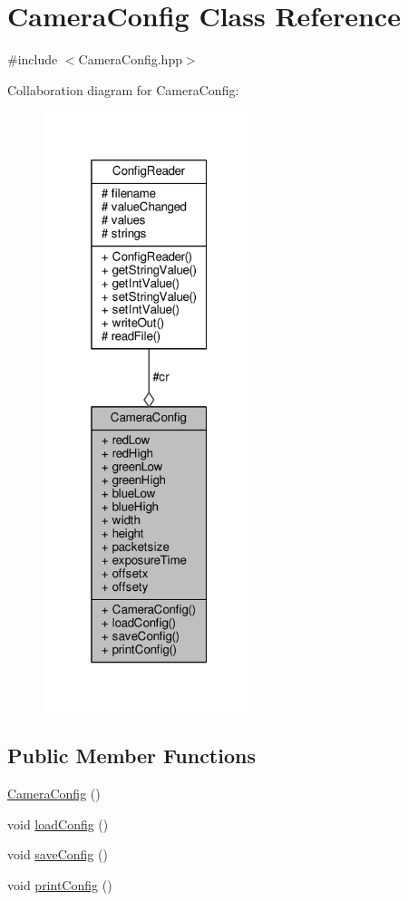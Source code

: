 \hypertarget{class_camera_config}{}\section{Camera\+Config Class Reference}
\label{class_camera_config}


{\ttfamily \#include $<$Camera\+Config.\+hpp$>$}



Collaboration diagram for Camera\+Config\+:\nopagebreak
\begin{figure}[H]
\begin{center}
\leavevmode
\includegraphics[width=175pt]{class_camera_config__coll__graph}
\end{center}
\end{figure}
\subsection*{Public Member Functions}
\begin{DoxyCompactItemize}
\item 
\hyperlink{class_camera_config_a03e6228afa19acfc757e310781372b6e}{Camera\+Config} ()
\item 
void \hyperlink{class_camera_config_ab8a2db9f299dc56cebcfc20b0ce72c8f}{load\+Config} ()
\item 
void \hyperlink{class_camera_config_a4c686a638a68bfa37b7490ad5fb235f6}{save\+Config} ()
\item 
void \hyperlink{class_camera_config_abc2e835a721d9724135dd88c387f2339}{print\+Config} ()
\end{DoxyCompactItemize}

